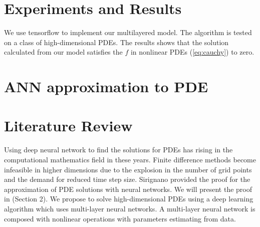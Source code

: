 \documentclass{article}
\begin{document}
\section{Experiments and Results}

We use tensorflow to implement our multilayered model. The algorithm is tested on a class of high-dimensional PDEs. The results shows that the solution calculated from our model satisfies the $f$ in nonlinear PDEs (\ref{eq:cauchy}) to zero.


\section{ANN approximation to PDE}

\section{Literature Review}

Using deep neural network to find the solutions for PDEs has rising in the computational mathematics field in these years.  Finite difference methods become infeasible in higher dimensions due to the explosion in the number of grid points and the demand for reduced time step size. Sirignano \cite{sirignano} provided the proof for the approximation of PDE solutions with neural networks. We will present the proof in (Section 2). We propose to solve high-dimensional PDEs using a deep learning algorithm which uses multi-layer neural networks. A multi-layer neural network is composed with nonlinear operations with parameters estimating from data.




\end{document}

